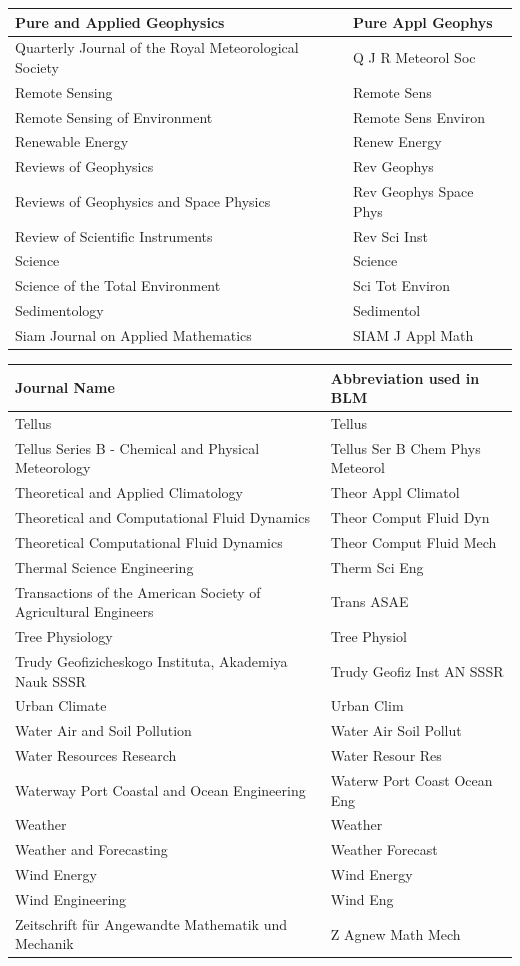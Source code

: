 \begin{longtable}{| p{8 cm} | p{6 cm} |}
Pure and Applied Geophysics & Pure Appl Geophys \\
\hline
Quarterly Journal of the Royal Meteorological Society & Q J R Meteorol Soc \\
\hline
Remote Sensing & Remote Sens \\
Remote Sensing of Environment & Remote Sens Environ \\
Renewable Energy & Renew Energy \\
Reviews of Geophysics & Rev Geophys \\
Reviews of Geophysics and Space Physics & Rev Geophys Space Phys \\
Review of Scientific Instruments & Rev Sci Inst \\
\hline
Science & Science \\
Science of the Total Environment & Sci Tot Environ \\
Sedimentology & Sedimentol \\
Siam Journal on Applied Mathematics & SIAM J Appl Math \\
\hline
\end{longtable}

\pagebreak[4]

\begin{longtable}{| p{8 cm} | p{6 cm} |}
\hline
Journal Name & Abbreviation used in BLM \\
\hline
Tellus & Tellus \\
Tellus Series B - Chemical and Physical Meteorology & Tellus Ser B Chem Phys Meteorol \\
Theoretical and Applied Climatology & Theor Appl Climatol \\
Theoretical and Computational Fluid Dynamics & Theor Comput Fluid Dyn \\
Theoretical Computational Fluid Dynamics & Theor Comput Fluid Mech \\
Thermal Science Engineering & Therm Sci Eng \\
Transactions of the American Society of Agricultural Engineers & Trans ASAE \\
Tree Physiology & Tree Physiol \\
Trudy Geofizicheskogo Instituta, Akademiya Nauk SSSR & Trudy Geofiz Inst AN SSSR \\
\hline
Urban Climate & Urban Clim \\
\hline
Water Air and Soil Pollution & Water Air Soil Pollut \\
Water Resources Research & Water Resour Res \\
Waterway Port Coastal and Ocean Engineering & Waterw Port Coast Ocean Eng \\
Weather & Weather \\
Weather and Forecasting & Weather Forecast \\
Wind Energy & Wind Energy \\
Wind Engineering & Wind Eng \\
\hline
Zeitschrift f\"{u}r Angewandte Mathematik und Mechanik & Z Agnew Math Mech \\
\hline



\hline
\end{longtable}



